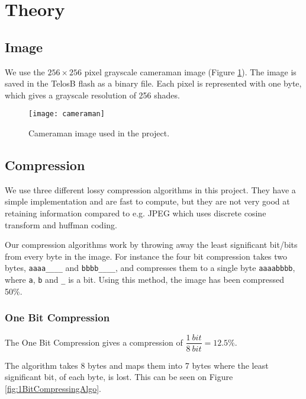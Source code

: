 \section{Theory}

\subsection{Image}
We use the $256 \times 256$ pixel grayscale cameraman image (Figure \ref{fig:image_cameraman}). The image is saved in the TelosB flash as a binary file. Each pixel is represented with one byte, which gives a grayscale resolution of 256 shades.

\begin{figure}[ht!]
\centering
\texttt{[image: cameraman]}
\caption{Cameraman image used in the project.}
\label{fig:image_cameraman}
\end{figure}

\subsection{Compression}

We use three different lossy compression algorithms in this project.
They have a simple implementation and are fast to compute, but they are not very good at retaining information compared to e.g. JPEG which uses discrete cosine transform and huffman coding.

Our compression algorithms work by throwing away the least significant bit/bits from every byte in the image.
For instance the four bit compression takes two bytes, \texttt{aaaa\_\_\_\_} and \texttt{bbbb\_\_\_\_}, and compresses them to a single byte \texttt{aaaabbbb}, where \texttt{a}, \texttt{b} and \texttt{\_} is a bit. Using this method, the image has been compressed 50\%.


\subsubsection{One Bit Compression} %
\label{sub:one_bit_compression}
\FloatBarrier

The One Bit Compression gives a compression of $\dfrac{1\ bit}{8\ bit} = 12.5\%$.

The algorithm takes 8 bytes and maps them into 7 bytes where the least significant bit, of each byte, is lost. This can be seen on Figure \ref{fig:1BitCompressingAlgo}.

